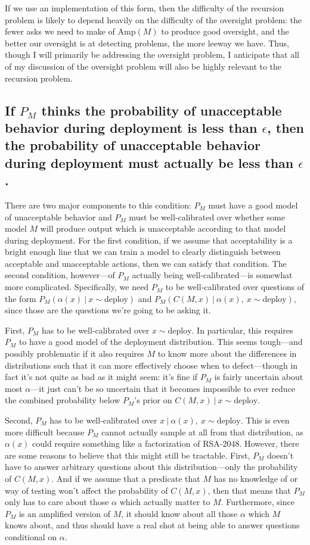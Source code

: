\documentclass{amsart}
\begin{document}
If we use an implementation of this form, then the difficulty of the recursion problem is likely to depend heavily on the difficulty of the oversight problem: the fewer asks we need to make of $\text{Amp}(M)$ to produce good oversight, and the better our oversight is at detecting problems, the more leeway we have. Thus, though I will primarily be addressing the oversight problem, I anticipate that all of my discussion of the oversight problem will also be highly relevant to the recursion problem.

\subsection{If $P_M$ thinks the probability of unacceptable behavior during deployment is less than $\epsilon$, then the probability of unacceptable behavior during deployment must actually be less than $\epsilon$.} There are two major components to this condition: $P_M$ must have a good model of unacceptable behavior and $P_M$ must be well-calibrated over whether some model $M$ will produce output which is unacceptable according to that model during deployment. For the first condition, if we assume that acceptability is a bright enough line that we can train a model to clearly distinguish between acceptable and unacceptable actions, then we can satisfy that condition. The second condition, however---of $P_M$ actually being well-calibrated---is somewhat more complicated. Specifically, we need $P_M$ to be well-calibrated over questions of the form $P_M(\alpha(x)\ |\ x \sim \text{deploy})$ and $P_M(C(M, x)\ |\ \alpha(x),~ x \sim \text{deploy})$, since those are the questions we're going to be asking it.

First, $P_M$ has to be well-calibrated over $x \sim \text{deploy}$. In particular, this requires $P_M$ to have a good model of the deployment distribution. This seems tough---and possibly problematic if it also requires $M$ to know more about the differences in distributions such that it can more effectively choose when to defect---though in fact it's not quite as bad as it might seem: it's fine if $P_M$ is fairly uncertain about most $\alpha$---it just can't be so uncertain that it becomes impossible to ever reduce the combined probability below $P_M$'s prior on $C(M, x)\ |\ x \sim \text{deploy}$.

Second, $P_M$ has to be well-calibrated over $x\ |\ \alpha(x),~ x \sim \text{deploy}$. This is even more difficult because $P_M$ cannot actually sample at all from that distribution, as $\alpha(x)$ could require something like a factorization of RSA-2048. However, there are some reasons to believe that this might still be tractable. First, $P_M$ doesn't have to answer arbitrary questions about this distribution---only the probability of $C(M, x)$. And if we assume that a predicate that $M$ has no knowledge of or way of testing won't affect the probability of $C(M, x)$, then that means that $P_M$ only has to care about those $\alpha$ which actually matter to $M$. Furthermore, since $P_M$ is an amplified version of $M$, it should know about all those $\alpha$ which $M$ knows about, and thus should have a real shot at being able to answer questions conditional on $\alpha$.
\end{document}
